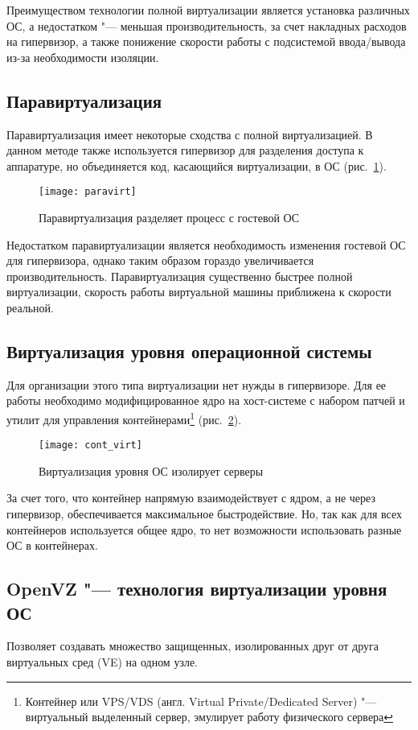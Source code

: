 Преимуществом технологии полной виртуализации является установка различных ОС, а недостатком "--- меньшая производительность, за счет накладных расходов на гипервизор, а также понижение скорости работы с подсистемой ввода/вывода из-за необходимости изоляции.

\subsection{Паравиртуализация}
Паравиртуализация имеет некоторые сходства с полной виртуализацией. 
В данном методе также используется гипервизор для разделения доступа к аппаратуре, но объединяется код, касающийся виртуализации, в ОС \cite{virtuallinux} (рис.~\ref{pic:paravirt}).
\begin{figure}[ht]
    \centering
	\texttt{[image: paravirt]}
	\caption{Паравиртуализация разделяет процесс с гостевой ОС}\label{pic:paravirt}
\end{figure}

Недостатком паравиртуализации является необходимость изменения гостевой ОС для гипервизора, однако таким образом гораздо увеличивается производительность.
Паравиртуализация существенно быстрее полной виртуализации, скорость работы виртуальной машины приближена к скорости реальной.

\subsection{Виртуализация уровня операционной системы}
Для организации этого типа виртуализации нет нужды в гипервизоре. 
Для ее работы необходимо модифицированное ядро на хост-системе с набором патчей и утилит для управления контейнерами\footnote{Контейнер или VPS/VDS (англ. Virtual Private/Dedicated Server) "--- виртуальный выделенный сервер, эмулирует работу физического сервера} (рис.~\ref{pic:cont_virt}).
\begin{figure}[ht]
    \centering
	\texttt{[image: cont\_virt]}
	\caption{Виртуализация уровня ОС изолирует серверы}\label{pic:cont_virt}
\end{figure}

За счет того, что контейнер напрямую взаимодействует с ядром, а не через гипервизор, обеспечивается максимальное быстродействие. Но, так как для всех контейнеров используется общее ядро, то нет возможности использовать разные ОС в контейнерах.

\subsection{OpenVZ "--- технология виртуализации уровня ОС}
Позволяет создавать множество защищенных, изолированных друг от друга виртуальных сред (VE) на одном узле. 

